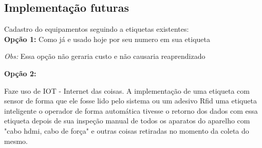 \subsection{\textbf{Implementação futuras}} 

  Cadastro do equipamentos seguindo a etiquetas existentes: 
  \\
  \textbf{Opção 1:} Como já e usado hoje por seu numero em sua etiqueta

  \textit{Obs:} Essa opção não geraria custo e não causaria reaprendizado
 
 
  \textbf{Opção 2:}
 
  Faze uso de IOT - Internet das coisas. A implementação de uma etiqueta com sensor de forma que ele fosse lido pelo
  sistema ou um adesivo Rfid uma etiqueta inteligente o operador de forma automática tivesse o retorno dos dados com
  essa etiqueta depois de sua inspeção manual de todos os aparatos do aparelho com "cabo hdmi, cabo de força" e outras
  coisas retiradas no momento da coleta do mesmo. 

